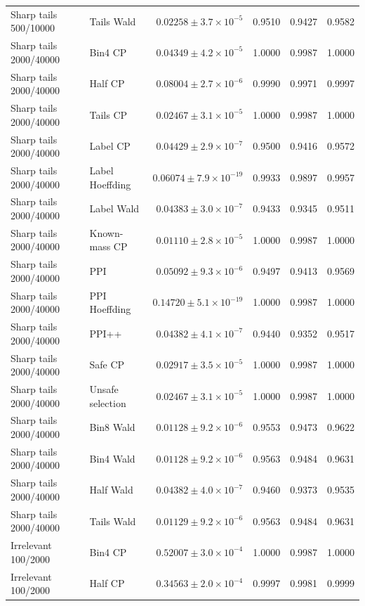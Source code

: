\begin{longtable}{llrrrr}
Sharp tails 500/10000 & Tails Wald & $0.02258\pm 3.7\times 10^{-5}$ & 0.9510 & 0.9427 & 0.9582 \\
Sharp tails 2000/40000 & Bin4 CP & $0.04349\pm 4.2\times 10^{-5}$ & 1.0000 & 0.9987 & 1.0000 \\
Sharp tails 2000/40000 & Half CP & $0.08004\pm 2.7\times 10^{-6}$ & 0.9990 & 0.9971 & 0.9997 \\
Sharp tails 2000/40000 & Tails CP & $0.02467\pm 3.1\times 10^{-5}$ & 1.0000 & 0.9987 & 1.0000 \\
Sharp tails 2000/40000 & Label CP & $0.04429\pm 2.9\times 10^{-7}$ & 0.9500 & 0.9416 & 0.9572 \\
Sharp tails 2000/40000 & Label Hoeffding & $0.06074\pm 7.9\times 10^{-19}$ & 0.9933 & 0.9897 & 0.9957 \\
Sharp tails 2000/40000 & Label Wald & $0.04383\pm 3.0\times 10^{-7}$ & 0.9433 & 0.9345 & 0.9511 \\
Sharp tails 2000/40000 & Known-mass CP & $0.01110\pm 2.8\times 10^{-5}$ & 1.0000 & 0.9987 & 1.0000 \\
Sharp tails 2000/40000 & PPI & $0.05092\pm 9.3\times 10^{-6}$ & 0.9497 & 0.9413 & 0.9569 \\
Sharp tails 2000/40000 & PPI Hoeffding & $0.14720\pm 5.1\times 10^{-19}$ & 1.0000 & 0.9987 & 1.0000 \\
Sharp tails 2000/40000 & PPI++ & $0.04382\pm 4.1\times 10^{-7}$ & 0.9440 & 0.9352 & 0.9517 \\
Sharp tails 2000/40000 & Safe CP & $0.02917\pm 3.5\times 10^{-5}$ & 1.0000 & 0.9987 & 1.0000 \\
Sharp tails 2000/40000 & Unsafe selection & $0.02467\pm 3.1\times 10^{-5}$ & 1.0000 & 0.9987 & 1.0000 \\
Sharp tails 2000/40000 & Bin8 Wald & $0.01128\pm 9.2\times 10^{-6}$ & 0.9553 & 0.9473 & 0.9622 \\
Sharp tails 2000/40000 & Bin4 Wald & $0.01128\pm 9.2\times 10^{-6}$ & 0.9563 & 0.9484 & 0.9631 \\
Sharp tails 2000/40000 & Half Wald & $0.04382\pm 4.0\times 10^{-7}$ & 0.9460 & 0.9373 & 0.9535 \\
Sharp tails 2000/40000 & Tails Wald & $0.01129\pm 9.2\times 10^{-6}$ & 0.9563 & 0.9484 & 0.9631 \\
Irrelevant 100/2000 & Bin4 CP & $0.52007\pm 3.0\times 10^{-4}$ & 1.0000 & 0.9987 & 1.0000 \\
Irrelevant 100/2000 & Half CP & $0.34563\pm 2.0\times 10^{-4}$ & 0.9997 & 0.9981 & 0.9999 \\

\end{longtable}
